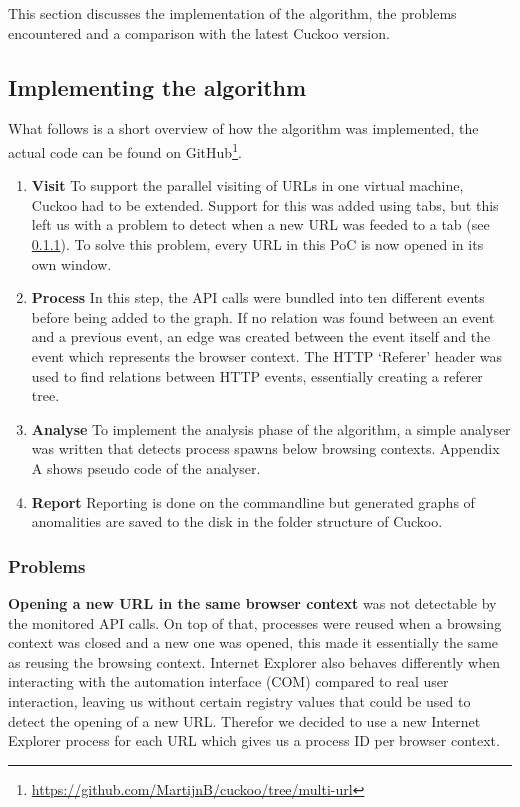 This section discusses the implementation of the algorithm, the problems encountered and a comparison with the latest Cuckoo version.

\subsection{Implementing the algorithm}

What follows is a short overview of how the algorithm was implemented, the actual code can be found on GitHub\footnote{\url{https://github.com/MartijnB/cuckoo/tree/multi-url}}.

\begin{enumerate}
\item \textbf{Visit} To support the parallel visiting of URLs in one virtual machine, Cuckoo had to be extended. Support for this was added using tabs, but this left us with a problem to detect when a new URL was feeded to a tab (see \ref{99problems}). To solve this problem, every URL in this PoC is now opened in its own window.

\item \textbf{Process} In this step, the API calls were bundled into ten different events before being added to the graph. If no relation was found between an event and a previous event, an edge was created between the event itself and the event which represents the browser context. The HTTP `Referer' header was used to find relations between HTTP events, essentially creating a referer tree\cite{qui}. 

\item \textbf{Analyse} To implement the analysis phase of the algorithm, a simple analyser was written that detects process spawns below browsing contexts. Appendix A shows pseudo code of the analyser.

\item \textbf{Report} Reporting is done on the commandline but generated graphs of anomalities are saved to the disk in the folder structure of Cuckoo.
\end{enumerate}

\subsubsection{Problems}
\label{99problems}

\textbf{Opening a new URL in the same browser context} was not detectable by the monitored API calls. On top of that, processes were reused when a browsing context was closed and a new one was opened, this made it essentially the same as reusing the browsing context. Internet Explorer also behaves differently when interacting with the automation interface (COM) compared to real user interaction, leaving us without certain registry values that could be used to detect the opening of a new URL. Therefor we decided to use a new Internet Explorer process for each URL which gives us a process ID per browser context.

